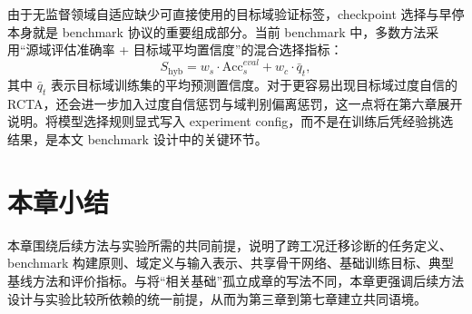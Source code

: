 由于无监督领域自适应缺少可直接使用的目标域验证标签，checkpoint 选择与早停本身就是 benchmark 协议的重要组成部分。当前 benchmark 中，多数方法采用“源域评估准确率 + 目标域平均置信度”的混合选择指标：
\begin{equation}
S_{\mathrm{hyb}}=
w_s\cdot \mathrm{Acc}_{s}^{eval}
+w_c\cdot \bar{q}_t,
\end{equation}
其中 $\bar{q}_t$ 表示目标域训练集的平均预测置信度。对于更容易出现目标域过度自信的 RCTA，还会进一步加入过度自信惩罚与域判别偏离惩罚，这一点将在第六章展开说明。将模型选择规则显式写入 experiment config，而不是在训练后凭经验挑选结果，是本文 benchmark 设计中的关键环节。

\section{本章小结}
本章围绕后续方法与实验所需的共同前提，说明了跨工况迁移诊断的任务定义、benchmark 构建原则、域定义与输入表示、共享骨干网络、基础训练目标、典型基线方法和评价指标。与将“相关基础”孤立成章的写法不同，本章更强调后续方法设计与实验比较所依赖的统一前提，从而为第三章到第七章建立共同语境。
